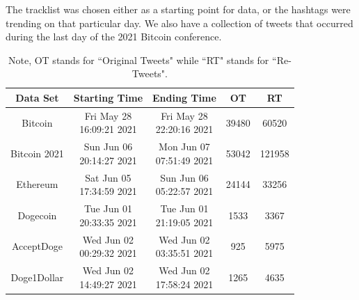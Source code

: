 \documentclass[a4paper,11pt]{article}
\begin{document}
The tracklist was chosen either as a starting point for data, or the hashtags were trending on that particular day.  We also have a collection of tweets that occurred during the last day of the 2021 Bitcoin conference.

\begin{table}[h!]
    \centering
     \begin{tabular}{||c c c c c||} 
     \hline
     Data Set & Starting Time & Ending Time & OT & RT\\ [0.5ex] 
    \hline\hline
     Bitcoin & \makecell{Fri May 28 \\ 16:09:21 2021} & \makecell{Fri May 28 
     \\ 22:20:16 2021} &   39480 & 60520 \\ 
    \hline
    Bitcoin 2021 & \makecell{Sun Jun 06 \\ 20:14:27 2021} & \makecell{Mon Jun 07\\
     07:51:49 2021} &  53042 & 121958 \\ 
   \hline
     Ethereum & \makecell{Sat Jun 05 \\ 17:34:59 2021} & \makecell{Sun Jun 06 \\
      05:22:57 2021} & 24144 & 33256 \\
    \hline
    Dogecoin & \makecell{Tue Jun 01 \\ 20:33:35 2021} & \makecell{Tue Jun 01\\
     21:19:05 2021} & 1533 & 3367 \\
    \hline
     AcceptDoge & \makecell{Wed Jun 02 \\ 00:29:32 2021} & \makecell{Wed Jun 02
      \\ 03:35:51 2021} & 925 & 5975 \\
    \hline
     Doge1Dollar & \makecell{Wed Jun 02 \\ 14:49:27 2021} & \makecell{Wed Jun 02
      \\ 17:58:24 2021} & 1265 & 4635 \\
    \hline\hline
     \end{tabular}
\caption{Note, OT stands for ``Original Tweets" while ``RT" stands for ``Re-Tweets".}
\end{table}
\end{document}
